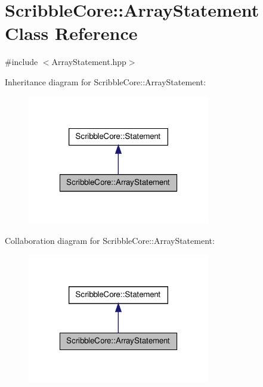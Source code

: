 \hypertarget{class_scribble_core_1_1_array_statement}{\section{Scribble\-Core\-:\-:Array\-Statement Class Reference}
\label{class_scribble_core_1_1_array_statement}
}


{\ttfamily \#include $<$Array\-Statement.\-hpp$>$}



Inheritance diagram for Scribble\-Core\-:\-:Array\-Statement\-:\nopagebreak
\begin{figure}[H]
\begin{center}
\leavevmode
\includegraphics[width=226pt]{class_scribble_core_1_1_array_statement__inherit__graph}
\end{center}
\end{figure}


Collaboration diagram for Scribble\-Core\-:\-:Array\-Statement\-:\nopagebreak
\begin{figure}[H]
\begin{center}
\leavevmode
\includegraphics[width=226pt]{class_scribble_core_1_1_array_statement__coll__graph}
\end{center}
\end{figure}
